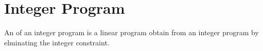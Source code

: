 \chapter{Integer Program}

  \par {}

  \par An  of an integer program is a linear program obtain from an integer program by elminating the integer constraint.